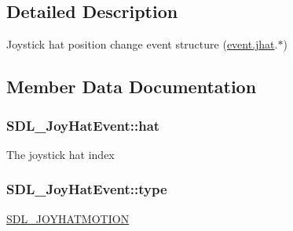 \subsection{Detailed Description}
Joystick hat position change event structure (\hyperlink{union_s_d_l___event_a421b40e0f8e01f181c8d5548cff1dd1d}{event.\+jhat}.$\ast$) 

\subsection{Member Data Documentation}
\hypertarget{struct_s_d_l___joy_hat_event_ab1b54a6d1091e583e856f86b5af1e2f6}{}
\subsubsection[{hat}]{ S\+D\+L\+\_\+\+Joy\+Hat\+Event\+::hat}\label{struct_s_d_l___joy_hat_event_ab1b54a6d1091e583e856f86b5af1e2f6}
The joystick hat index \hypertarget{struct_s_d_l___joy_hat_event_ac583dafab46c44354e210a542aff57cc}{}
\subsubsection[{type}]{ S\+D\+L\+\_\+\+Joy\+Hat\+Event\+::type}\label{struct_s_d_l___joy_hat_event_ac583dafab46c44354e210a542aff57cc}
\hyperlink{_s_d_l__events_8h_a3b589e89be6b35c02e0dd34a55f3fccaafba4080bfbad335e520097b2024f0dff}{S\+D\+L\+\_\+\+J\+O\+Y\+H\+A\+T\+M\+O\+T\+I\+O\+N} \hypertarget{struct_s_d_l___joy_hat_event_a52b179a34407449941b61d988ca72ef4}{}
